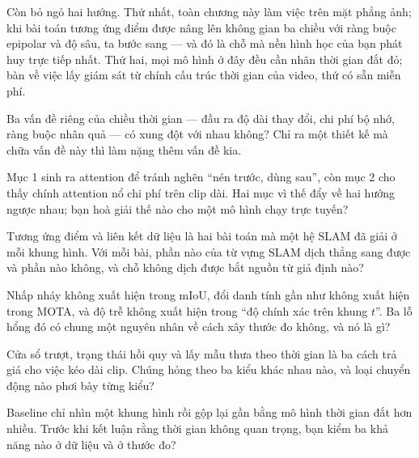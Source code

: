\documentclass[../../deep_learning.tex]{subfiles}
\begin{document}
Còn bỏ ngỏ hai hướng. Thứ nhất, toàn chương này làm việc trên mặt phẳng ảnh; khi bài toán tương ứng điểm được nâng lên không gian ba chiều với ràng buộc epipolar và độ sâu, ta bước sang  --- và đó là chỗ mà nền hình học của bạn phát huy trực tiếp nhất. Thứ hai, mọi mô hình ở đây đều cần nhãn thời gian đắt đỏ;  bàn về việc lấy giám sát từ chính cấu trúc thời gian của video, thứ có sẵn miễn phí.
\begin{tukiem}
\item Ba vấn đề riêng của chiều thời gian --- đầu ra độ dài thay đổi, chi phí bộ nhớ, ràng buộc nhân quả --- có xung đột với nhau không? Chỉ ra một thiết kế mà chữa vấn đề này thì làm nặng thêm vấn đề kia.
\item Mục 1 sinh ra attention để tránh nghẽn ``nén trước, dùng sau'', còn mục 2 cho thấy chính attention nổ chi phí trên clip dài. Hai mục vì thế đẩy về hai hướng ngược nhau; bạn hoà giải thế nào cho một mô hình chạy trực tuyến?
\item Tương ứng điểm và liên kết dữ liệu là hai bài toán mà một hệ SLAM đã giải ở mỗi khung hình. Với mỗi bài, phần nào của từ vựng SLAM dịch thẳng sang được và phần nào không, và chỗ không dịch được bắt nguồn từ giả định nào?
\item Nhấp nháy không xuất hiện trong mIoU, đổi danh tính gần như không xuất hiện trong MOTA, và độ trễ không xuất hiện trong ``độ chính xác trên khung \(t\)''. Ba lỗ hổng đó có chung một nguyên nhân về cách xây thước đo không, và nó là gì?
\item Cửa sổ trượt, trạng thái hồi quy và lấy mẫu thưa theo thời gian là ba cách trả giá cho việc kéo dài clip. Chúng hỏng theo ba kiểu khác nhau nào, và loại chuyển động nào phơi bày từng kiểu?
\item Baseline chỉ nhìn một khung hình rồi gộp lại gần bằng mô hình thời gian đắt hơn nhiều. Trước khi kết luận rằng thời gian không quan trọng, bạn kiểm ba khả năng nào ở dữ liệu và ở thước đo?
\end{tukiem}
\ifSubfilesClassLoaded{\printbibliography[title={Nguồn}]}{}
\end{document}
